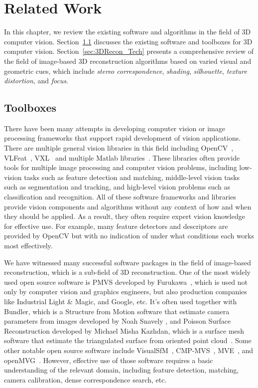 
\chapter{Related Work}
\label{ch:RelatedWork}
In this chapter, we review the existing software and algorithms in the field of 3D computer vision. Section~\ref{sec:Toolbox} discusses the existing software and toolboxes for 3D computer vision. Section~\ref{sec:3DRecon_Tech} presents a comprehensive review of the field of image-based 3D reconstruction algorithms based on varied visual and geometric cues, which include \textit{stereo correspondence}, \textit{shading}, \textit{silhouette}, \textit{texture distortion}, and \textit{focus}.

\section{Toolboxes}
\label{sec:Toolbox}
There have been many attempts in developing computer vision or image processing frameworks that support rapid development of vision applications. There are multiple general vision libraries in this field including OpenCV~\cite{bradski2008learning}, VLFeat~\cite{vedaldi08vlfeat}, VXL~\cite{vxl17} and multiple Matlab libraries~\cite{KovesiMATLABCode, MariottiniPr_RAM05}. These libraries often provide tools for multiple image processing and computer vision problems, including low-vision tasks such as feature detection and matching, middle-level vision tasks such as segmentation and tracking, and high-level vision problems such as classification and recognition. All of these software frameworks and libraries provide vision components and algorithms without any context of how and when they should be applied. As a result, they often require expert vision knowledge for effective use. For example, many feature detectors and descriptors are provided by OpenCV but with no indication of under what conditions each works most effectively.

We have witnessed many successful software packages in the field of image-based reconstruction, which is a sub-field of 3D reconstruction. One of the most widely used open source software is PMVS developed by Furukawa~\cite{furukawa2010accurate}, which is used not only by computer vision and graphics engineers, but also production companies like Industrial Light \& Magic, and Google, etc. It's often used together with Bundler, which is a Structure from Motion software that estimate camera parameters from images developed by Noah Snavely \cite{snavely2006photo}, and Poisson Surface Reconstruction developed by Michael Misha Kazhdan, which is a surface mesh software that estimate the triangulated surface from oriented point cloud~\cite{kazhdan2006poisson}. Some other notable open source software include VisualSfM~\cite{wu2011visualsfm}, CMP-MVS~\cite{Heller-etal-MVA-2015}, MVE~\cite{fuhrmann2014mve}, and openMVG~\cite{openMVG}. However, effective use of those software requires a basic understanding of the relevant domain, including feature detection, matching, camera calibration, dense correspondence search, etc.

